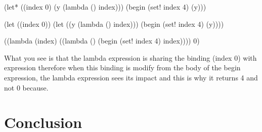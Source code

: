 \documentclass[a4paper,10pt,twoside]{book}
\begin{document}
\begin{code}{}
(let* ((index 0)
       (y (lambda () index)))
  (begin
    (set! index 4)
    (y)))
\end{code}

\begin{code}{}
(let ((index 0))
  (let ((y (lambda () index)))
    (begin
      (set! index 4)
      (y))))
\end{code}

\begin{code}{}
((lambda (index)
   ((lambda () (begin 
                (set! index 4)
                index))))
 0)
\end{code}


What you see is that the lambda expression is sharing the binding (index 0) with expression 
therefore when this binding is modify from the body of the begin expression, the lambda expression sees its impact
and this is why it returns 4 and not 0 because. 


\section{Conclusion}


\ifx\wholebook\relax\else
   
   
\end{document}
